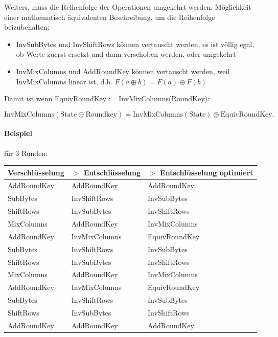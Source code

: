 Weiters, muss die Reihenfolge der Operationen umgekehrt werden.
Möglichkeit einer mathematisch äquivalenten Beschreibung, um die Reihenfolge beizubehalten:

\begin{itemize}
    \item InvSubBytes und InvShiftRows können vertauscht werden, es ist völlig egal, ob Werte zuerst ersetzt und dann verschoben werden, oder umgekehrt
    \item InvMixColumns und AddRoundKey können vertauscht werden, weil InvMixColumns linear ist, d.h. $F(a\oplus b) = F(a) \oplus F(b)$
\end{itemize}

\noindent Damit ist wenn EquivRoundKey := InvMixColumns(RoundKey):

$$\text{InvMixColumns}(\text{State} \oplus \text{Roundkey}) = \text{InvMixColumns}(\text{State}) \oplus \text{EquivRoundKey}.$$ 

\paragraph{Beispiel} für 3 Runden:

\begin{center}
    \begin{tabular}{ lll } 
        \hline
        Verschlüsselung & $>$ Entschlüsselung & $>$ Entschlüsselung optimiert\\ 
        \hline
        AddRoundKey & AddRoundKey   & AddRoundKey \\
        SubBytes    & InvShiftRows  & InvSubBytes \\
        ShiftRows   & InvSubBytes   & InvShiftRows \\ 
        MixColumns  & AddRoundKey   & InvMixColumns \\
        AddRoundKey & InvMixColumns & EquivRoundKey \\
        SubBytes    & InvShiftRows  & InvSubBytes \\
        ShiftRows   & InvSubBytes   & InvShiftRows \\
        MixColumns  & AddRoundKey   & InvMixColumns \\
        AddRoundKey & InvMixColumns & EquivRoundKey \\
        SubBytes    & InvShiftRows  & InvSubBytes \\
        ShiftRows   & InvSubBytes   & InvShiftRows \\
        AddRoundKey & AddRoundKey   & AddRoundKey \\
        \hline
    \end{tabular}
\end{center}

